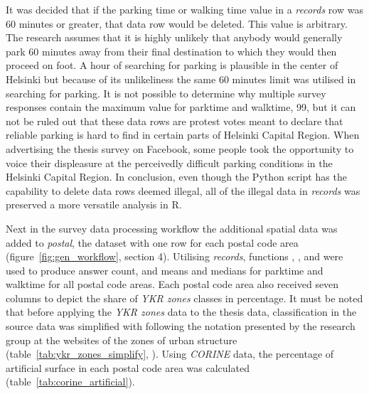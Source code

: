 It was decided that if the parking time or walking time value in a \textit{records} row was 60 minutes or greater, that data row would be deleted. This value is arbitrary. The research assumes that it is highly unlikely that anybody would generally park 60 minutes away from their final destination to which they would then proceed on foot. A hour of searching for parking is plausible in the center of Helsinki but because of its unlikeliness the same 60 minutes limit was utilised in searching for parking. It is not possible to determine why multiple survey responses contain the maximum value for parktime and walktime, 99, but it can not be ruled out that these data rows are protest votes meant to declare that reliable parking is hard to find in certain parts of Helsinki Capital Region. When advertising the thesis survey on Facebook, some people took the opportunity to voice their displeasure at the perceivedly difficult parking conditions in the Helsinki Capital Region. In conclusion, even though the Python script has the capability to delete data rows deemed illegal, all of the illegal data in \textit{records} was preserved a more versatile analysis in R.

Next in the survey data processing workflow the additional spatial data was added to \textit{postal}, the dataset with one row for each postal code area (figure~\ref{fig:gen_workflow}, section 4). Utilising \textit{records}, functions , , and  were used to produce answer count, and means and medians for parktime and walktime for all postal code areas. Each postal code area also received seven columns to depict the share of \textit{YKR zones} classes in percentage. It must be noted that before applying the \textit{YKR zones} data to the thesis data, classification in the source data was simplified with following the notation presented by the research group at the websites of the zones of urban structure (table~\ref{tab:ykr_zones_simplify}, \cite{FinnishEnvironmentInstitute2013}). Using \textit{CORINE} data, the percentage of artificial surface in each postal code area was calculated (table~\ref{tab:corine_artificial}).

